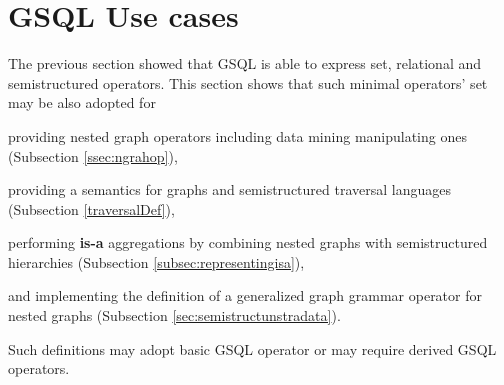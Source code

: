 

\section{GSQL Use cases}\label{ssec:travgraphop}
The previous section showed that GSQL is able to express set, relational and semistructured operators. This section shows that
such minimal operators' set may be also adopted for 
\begin{mylist}
	\item providing nested graph operators including data mining manipulating ones (Subsection \vref{ssec:ngrahop}),
	\item providing a semantics for graphs and semistructured traversal languages (Subsection \vref{traversalDef}),
	\item performing \textbf{is-a} aggregations by combining nested graphs with semistructured hierarchies (Subsection \vref{subsec:representingisa}),
	\item and implementing the definition of a generalized graph grammar operator for nested graphs (Subsection \vref{sec:semistructunstradata}).
\end{mylist} Such definitions may adopt basic GSQL operator or may require derived GSQL operators.

